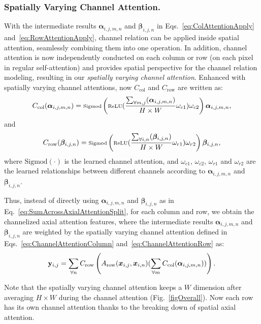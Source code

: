 \documentclass[letterpaper]{article} \usepackage{aaai22}  \usepackage{times}  \usepackage{helvet}  \usepackage{courier}  \usepackage[hyphens]{url}  \usepackage{graphicx} \urlstyle{rm} \def\UrlFont{\rm}  \usepackage{natbib}  \usepackage{caption} \DeclareCaptionStyle{ruled}{labelfont=normalfont,labelsep=colon,strut=off} \frenchspacing  \setlength{\pdfpagewidth}{8.5in}  \setlength{\pdfpageheight}{11in}  \usepackage{algorithm}
\begin{document}
\subsubsection{Spatially Varying Channel Attention.}
With the intermediate results $\bm{\alpha}_{i,j,m,n}$ and $\bm{\beta}_{i,j,n}$ in Eqs.~\eqref{eq:ColAttentionApply} and~\eqref{eq:RowAttentionApply}, channel relation can be applied inside spatial attention, seamlessly combining them into one operation.
In addition, channel attention is now independently conducted on each column or row (on each pixel in regular self-attention) and provides spatial perspective for the channel relation modeling, resulting in our \textit{spatially varying channel attention}.
Enhanced with spatially varying channel attentions, now $C_\text{col}$ and $C_\text{row}$ are written as:
\begin{equation}
\scriptsize
C_\text{col}(\bm{\alpha}_{i,j,m,n}) = \text{Sigmod}\left( \text{ReLU}(\frac{ \sum_{\forall m,j}(\bm{\alpha}_{i,j,m,n})}{H \times W}\omega_{c1}) \omega_{c2} \right)\bm{\alpha}_{i,j,m,n},
\label{eq:ChannelAttentionColumn}
\end{equation}
and
\begin{equation}
\scriptsize
C_\text{row}(\bm{\beta}_{i,j,n}) = \text{Sigmod}\left( \text{ReLU}(\frac{ \sum_{\forall i,n}(\bm{\beta}_{i,j,n})}{H \times W} \omega_{r1}) \omega_{r2} \right)\bm{\beta}_{i,j,n},
\label{eq:ChannelAttentionRow}
\end{equation}
where $\text{Sigmod} (\cdot) $ is the learned channel attention, and $\omega_{c1}$, $\omega_{c2}$, $\omega_{r1}$ and $\omega_{r2}$ are the learned relationships between different channels according to $\bm{\alpha}_{i,j,m,n}$ and $\bm{\beta}_{i,j,n}$.

Thus, instead of directly using $\bm{\alpha}_{i,j,m,n}$ and $\bm{\beta}_{i,j,n}$ as in Eq.~\eqref{eq:SumAcrossAxialAttentionSplit}, 
for each column and row, we obtain the channelized axial attention features, 
where the intermediate results $\bm{\alpha}_{i,j,m,n}$ and $\bm{\beta}_{i,j,n}$ are weighted by the spatially varying channel attention defined in  Eqs.~\eqref{eq:ChannelAttentionColumn} and~\eqref{eq:ChannelAttentionRow} as: 
\begin{equation}
\scriptsize
\mathbf{y}_{i,j} = \sum_{\forall n} C_\text{row}\left(A_\text{row}(\bm{x}_{i,j}, \bm{x}_{i,n})(\sum_{\forall m} C_\text{col}(\bm{\alpha}_{i,j,m,n}) )\right). 
\label{eq:CAAFinal}
\end{equation}

Note that the spatially varying channel attention keeps a $W$ dimension after averaging $H\times W$ during the channel attention (Fig.~\ref{figOverall}). 
Now each row has its own channel attention thanks to the breaking down of spatial axial attention.
\end{document}
